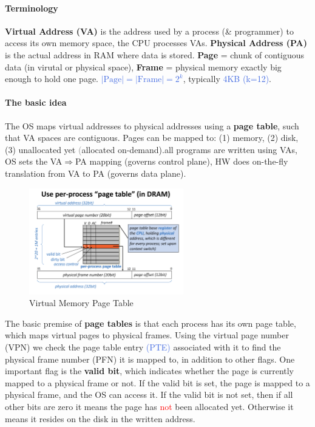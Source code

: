 \documentclass[openany,12pt]{book}
\newcommand{\red}[1]{\textcolor{Red}{#1}}
\newcommand{\blue}[1]{\textcolor{RoyalBlue}{#1}}
\newcommand{\gray}[1]{\textcolor{gray}{#1}}
\begin{document}
\paragraph{Terminology} \textbf{Virtual Address (VA)} is the address used by a process (\& programmer) to access its own memory space, the CPU processes VAs. \textbf{Physical Address (PA)} is the actual address in RAM where data is stored. \textbf{Page} = chunk of contiguous data (in virutal or physical space), \textbf{Frame} = physical memory exactly big enough to hold one page. \blue{\(|\text{Page}|=|\text{Frame}|=2^k\)}, typically \blue{4KB (k=12)}.


\paragraph{The basic idea} The OS maps virtual addresses to physical addresses using a \textbf{page table}, such that VA spaces are contiguous. Pages can be mapped to: (1) memory, (2) disk, (3) unallocated yet \gray(allocated on-demand).all programs are written using VAs, OS sets the VA\(\Longrightarrow\)PA mapping (governs control plane), HW does on-the-fly translation from VA to PA (governs data plane). 


\begin{figure}[h!]
  \centering
  \includegraphics[width=0.6\textwidth]{page-table.png}
  \caption{Virtual Memory Page Table}
\end{figure}


The basic premise of \textbf{page tables} is that each process has its own page table, which maps virtual pages to physical frames. Using the virtual page number (VPN) we check the page table entry \blue{(PTE)} associated with it to find the physical frame number (PFN) it is mapped to, in addition to other flags. One important flag is the \textbf{valid bit}, which indicates whether the page is currently mapped to a physical frame or not. If the valid bit is set, the page is mapped to a physical frame, and the OS can access it. If the valid bit is not set, then if all other bits are zero it means the page has \red{not} been allocated yet. Otherwise it means it resides on the disk in the written address. 
\end{document}
